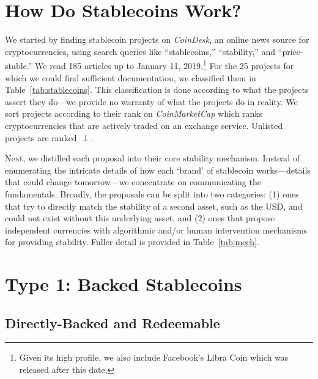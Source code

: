 

\section{How Do Stablecoins Work?}

We started by finding stablecoin projects on \textit{CoinDesk}, an online news source for cryptocurrencies, using search queries like ``stablecoins,'' ``stability,'' and ``price-stable.'' We read 185 articles up to January 11, 2019.\footnote{Given its high profile, we also include Facebook's Libra Coin which was released after this date.} For the 25 projects for which we could find sufficient documentation, we classified them in Table~\ref{tab:stablecoins}. This classification is done according to what the projects assert they do---we provide no warranty of what the projects do in reality. We sort projects according to their rank on \textit{CoinMarketCap} which ranks cryptocurrencies that are actively traded on an exchange service. Unlisted projects are ranked $\perp$.

Next, we distilled each proposal into their core stability mechanism. Instead of enumerating the intricate details of how each `brand' of stablecoin works---details that could change tomorrow---we concentrate on communicating the fundamentals. Broadly, the proposals can be split into two categories: (1) ones that try to directly match the stability of a second asset, such as the USD, and could not exist without this underlying asset, and (2) ones that propose independent currencies with algorithmic and/or human intervention mechanisms for providing stability. Fuller detail is provided in Table~\ref{tab:mech}.









\section{Type 1: Backed Stablecoins}
\label{sec:t1}

\subsection{Directly-Backed and Redeemable}
\label{sec:redeem}


